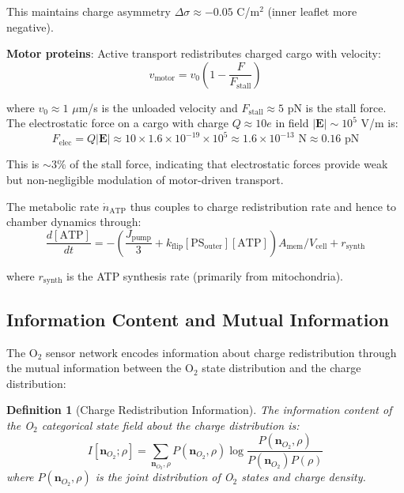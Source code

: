 \documentclass[twocolumn,10pt,aps,prd,superscriptaddress,floatfix,nofootinbib]{revtex4-2}
\newtheorem{definition}[theorem]{Definition}
\theoremstyle{remark}
\begin{document}
This maintains charge asymmetry $\Delta\sigma \approx -0.05$ C/m$^2$ (inner leaflet more negative).

\textbf{Motor proteins}: Active transport redistributes charged cargo with velocity:
\begin{equation}
v_{\mathrm{motor}} = v_0\left(1 - \frac{F}{F_{\mathrm{stall}}}\right)
\label{eq:motor_velocity}
\end{equation}

where $v_0 \approx 1$ $\mu$m/s is the unloaded velocity and $F_{\mathrm{stall}} \approx 5$ pN is the stall force. The electrostatic force on a cargo with charge $Q \approx 10e$ in field $|\mathbf{E}| \sim 10^5$ V/m is:
\begin{equation}
F_{\mathrm{elec}} = Q|\mathbf{E}| \approx 10 \times 1.6 \times 10^{-19} \times 10^5 \approx 1.6 \times 10^{-13} \text{ N} \approx 0.16 \text{ pN}
\end{equation}

This is $\sim 3\%$ of the stall force, indicating that electrostatic forces provide weak but non-negligible modulation of motor-driven transport.

The metabolic rate $\dot{n}_{\mathrm{ATP}}$ thus couples to charge redistribution rate and hence to chamber dynamics through:
\begin{equation}
\frac{d[\mathrm{ATP}]}{dt} = -\left(\frac{J_{\mathrm{pump}}}{3} + k_{\mathrm{flip}}[\mathrm{PS}_{\mathrm{outer}}][\mathrm{ATP}]\right)A_{\mathrm{mem}}/V_{\mathrm{cell}} + r_{\mathrm{synth}}
\label{eq:ATP_balance}
\end{equation}

where $r_{\mathrm{synth}}$ is the ATP synthesis rate (primarily from mitochondria).

\subsection{Information Content and Mutual Information}

The O$_2$ sensor network encodes information about charge redistribution through the mutual information between the O$_2$ state distribution and the charge distribution:

\begin{definition}[Charge Redistribution Information]
\label{def:charge_info}
The information content of the O$_2$ categorical state field about the charge distribution is:
\begin{equation}
I[\mathbf{n}_{O_2}; \rho] = \sum_{\mathbf{n}_{O_2}, \rho} P(\mathbf{n}_{O_2}, \rho) \log\frac{P(\mathbf{n}_{O_2}, \rho)}{P(\mathbf{n}_{O_2})P(\rho)}
\label{eq:mutual_info}
\end{equation}
where $P(\mathbf{n}_{O_2}, \rho)$ is the joint distribution of O$_2$ states and charge density.
\end{definition}
\end{document}
